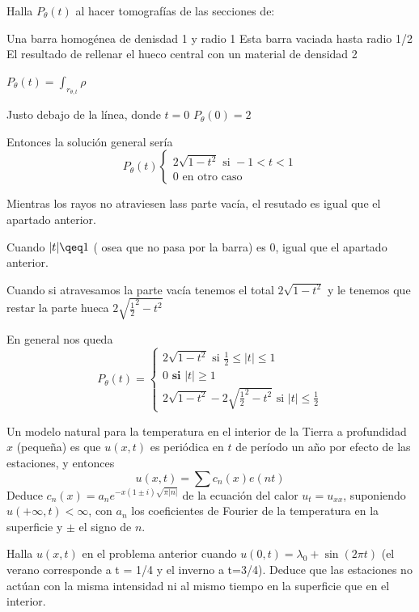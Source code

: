\begin{problem}[15]
Halla $P_{\theta}(t)$ al hacer tomografías de las secciones de:

\ppart Una barra homogénea de denisdad 1 y radio 1
\ppart Esta barra vaciada hasta radio 1/2
\ppart El resultado de rellenar el hueco central con un material de densidad 2
\solution

\ppart $P_{\theta}(t) = \int_{r_{\theta, t}} \rho$

Justo debajo de la línea, donde $t = 0$ $P_{\theta}(0) = 2$

Entonces la solución general sería
\[P_{\theta}(t) \begin{cases}
2 \sqrt{1-t^2} \text{ si } -1<t<1\\
0 \text{ en otro caso}
\end{cases}\]

\ppart Mientras los rayos no atraviesen lass parte vacía, el resutado es igual que el apartado anterior.

Cuando $|t| \qeq 1$  ( osea que no pasa por la barra) es 0, igual que el apartado anterior.

Cuando si atravesamos la parte vacía tenemos el total $2 \sqrt{1-t^2}$ y le tenemos que restar la parte hueca $2 \sqrt{{\frac{1}{2}}^2 - t^2}$

En general nos queda
\[ P_{\theta}(t)= \begin{cases}
2 \sqrt{1-t^2} \text{ si } \frac{1}{2} \leq |t| \leq 1\\
0 \textbf{ si } |t| \geq 1\\
2 \sqrt{1-t^2}- 2 \sqrt{{\frac{1}{2}}^2 - t^2}\text{ si } |t| \leq \frac{1}{2}
\end{cases}\]

\end{problem}

\begin{problem}[16]
Un modelo natural para la temperatura en el interior de la Tierra a profundidad $x$ (pequeña) es que $u(x,t)$ es periódica en $t$ de período un año por efecto de las estaciones, y entonces
\[u(x,t)=\sum c_n(x)e(nt)\]
Deduce $c_n(x)=a_ne^{-x(1\pm i)\sqrt{π|n|}}$ de la ecuación del calor $u_t=u_{xx}$, suponiendo $u(+\infty, t)< \infty$, con $a_n$ los coeficientes de Fourier de la temperatura en la superficie y $\pm$ el signo de $n$.
\solution


\end{problem}

\begin{problem}[17]
Halla $u(x,t)$ en el problema anterior cuando $u(0,t)=λ_0+\sin(2πt)$ (el verano corresponde a t = 1/4 y el inverno a t=3/4). Deduce que las estaciones no actúan con la misma intensidad ni al mismo tiempo en la superficie que en el interior.
\solution

\end{problem}

